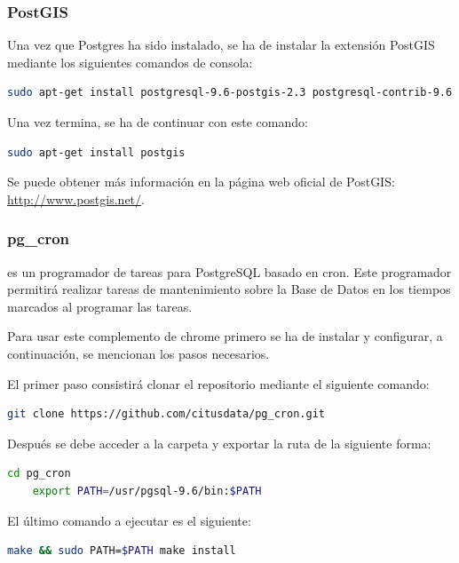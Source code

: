 \subsubsection{PostGIS}

Una vez que Postgres ha sido instalado, se ha de instalar la extensión PostGIS mediante los siguientes comandos de consola:

\begin{lstlisting}[language=bash]
	sudo apt-get install postgresql-9.6-postgis-2.3 postgresql-contrib-9.6
\end{lstlisting}
Una vez termina, se ha de continuar con este comando:

\begin{lstlisting}[language=bash]
	sudo apt-get install postgis
\end{lstlisting}

Se puede obtener más información en la página web oficial de PostGIS: \url{http://www.postgis.net/}.

\subsubsection{pg\_cron}

 es un programador de tareas para PostgreSQL basado en cron. Este programador permitirá realizar tareas de mantenimiento sobre la Base de Datos en los tiempos marcados al programar las tareas.

Para usar este complemento de chrome primero se ha de instalar y configurar, a continuación, se mencionan los pasos necesarios.


El primer paso consistirá clonar el repositorio mediante el siguiente comando:

\begin{lstlisting}[language=bash]
	git clone https://github.com/citusdata/pg_cron.git
\end{lstlisting}

Después se debe acceder a la carpeta y exportar la ruta de la siguiente forma:

\begin{lstlisting}[language=bash]
	cd pg_cron
	export PATH=/usr/pgsql-9.6/bin:$PATH
\end{lstlisting}

El último comando a ejecutar es el siguiente:

\begin{lstlisting}[language=bash]
	make && sudo PATH=$PATH make install
\end{lstlisting}

